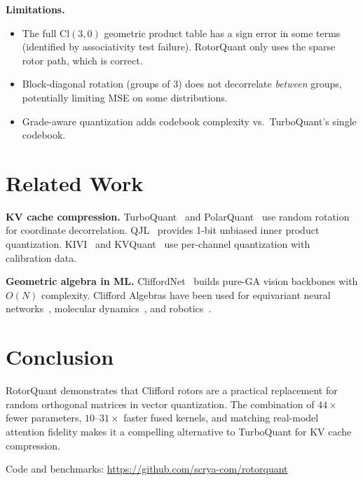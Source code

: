 \documentclass[10pt,twocolumn]{article}
\begin{document}
\textbf{Limitations.}
\begin{itemize}[nosep]
  \item The full $\mathrm{Cl}(3,0)$ geometric product table has a sign error in some terms (identified by associativity test failure). RotorQuant only uses the sparse rotor path, which is correct.
  \item Block-diagonal rotation (groups of 3) does not decorrelate \emph{between} groups, potentially limiting MSE on some distributions.
  \item Grade-aware quantization adds codebook complexity vs.\ TurboQuant's single codebook.
\end{itemize}

\section{Related Work}
\label{sec:related}

\textbf{KV cache compression.}
TurboQuant~\cite{turboquant} and PolarQuant~\cite{polarquant} use random rotation for coordinate decorrelation.
QJL~\cite{qjl} provides 1-bit unbiased inner product quantization.
KIVI~\cite{kivi} and KVQuant~\cite{kvquant} use per-channel quantization with calibration data.

\textbf{Geometric algebra in ML.}
CliffordNet~\cite{cliffordnet} builds pure-GA vision backbones with $O(N)$ complexity.
Clifford Algebras have been used for equivariant neural networks~\cite{ruhe2023clifford}, molecular dynamics~\cite{brehmer2023geometric}, and robotics~\cite{bayro2020geometric}.

\section{Conclusion}

RotorQuant demonstrates that Clifford rotors are a practical replacement for random orthogonal matrices in vector quantization.
The combination of $44\times$ fewer parameters, $10$--$31\times$ faster fused kernels, and matching real-model attention fidelity makes it a compelling alternative to TurboQuant for KV cache compression.

Code and benchmarks: \url{https://github.com/scrya-com/rotorquant}
\end{document}
